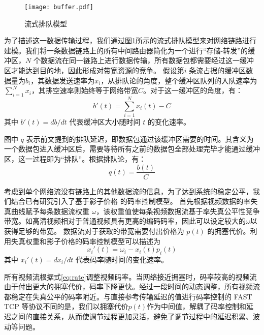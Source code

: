 \begin{figure}[htbp]
  \centering
  \texttt{[image: buffer.pdf]}
  \caption{流式排队模型}
  \label{fig:buffer}
\end{figure}

为了描述这一数据传输过程，我们通过图\ref{fig:buffer}所示的流式排队模型来对网络链路进行建模。我们将一条数据链路上的所有中间路由器简化为一个进行``存储-转发''的缓冲区，$N$ 个数据流在同一链路上进行数据传输，所有数据包都需要经过这一缓冲区才能达到目的地，因此形成对带宽资源的竞争。
假设第$i$ 条流占据的缓冲区数据量为$b_i$，其数据发送速率为$x_i$，从排队论的角度，整个缓冲区队列的入队速率为$\sum_{i=1}^N{x_i}$，其排空速率则始终等于网络带宽$C$。对于这一缓冲区的角度，有：
\begin{equation}
\label{eq:buffer}
  b'(t) = \sum_{i=1}^N{x_i(t)} - C
\end{equation}
其中 $b'(t)=db/dt$ 代表缓冲区大小随时间 $t$ 的变化速率。

图中 $q$ 表示前文提到的排队延迟，即数据包通过该缓冲区需要的时间。其含义为一个数据包进入缓冲区后，需要等待所有之前的数据包全部处理完毕才能通过缓冲区，这一过程即为``排队''。根据排队论，有：
\begin{equation}
\label{eq:delay}
    q(t) = \frac{b(t)}{C}
\end{equation}

考虑到单个网络流没有链路上的其他数据流的信息，为了达到系统的稳定公平，我们结合已有研究引入了基于影子价格 \cite{kelly1997charging}的码率控制模型。
首先根据视频数据的率失真曲线\cite{berger1971rate}赋予每条数据流权重 $\omega$，该权重值使每条视频数据流基于率失真公平性竞争带宽。如高清视频相对于普通视频具有更高的编码码率，因此可以设定较大的$\omega$以获得足够的带宽。
数据流对于获取的带宽需要付出价格为 $p(t)$ 的拥塞代价。利用失真权重和影子价格的码率控制模型可以描述为
\begin{equation}
\label{eq:rate}
    x_i'(t) = \omega_i - x_i(t)p_i(t)
\end{equation}
其中 $x_i'(t)=dx_i/dt$ 代表码率随时间的变化速率。

所有视频流根据式\ref{eq:rate}调整视频码率。当网络接近拥塞时，码率较高的视频流由于付出更大的拥塞代价，码率下降更快。经过一段时间的动态调整，所有视频流都稳定在失真公平的码率附近。与直接参考传输延迟的值进行码率控制的 FAST TCP\cite{wei2006fast} 等协议不同的是，我们以拥塞代价$p(t)$作为中间值，解耦了码率控制和延迟之间的直接关系，从而使调节过程更加灵活，避免了调节过程中的延迟积累、波动等问题。


